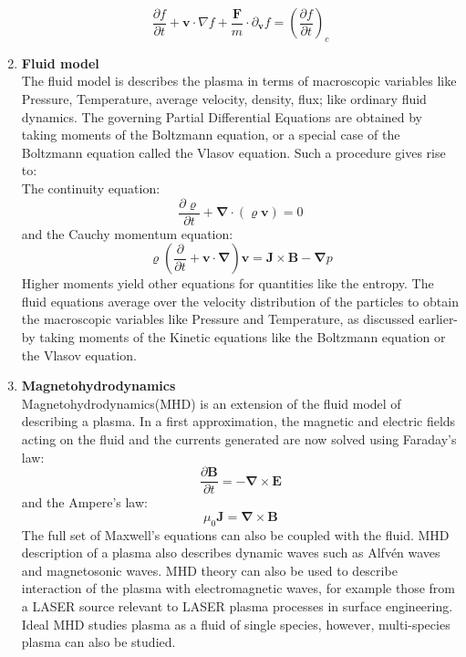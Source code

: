 \documentclass[12pt]{article}
\begin{document}
\begin{enumerate}
		$$\frac{\partial f}{\partial t} + \boldsymbol{v} \cdot \nabla f + \frac{\mathbf{F}}{m} \cdot {\partial}_{\boldsymbol{v}} f = \left(\frac{\partial f}{\partial t}\right)_{c}$$
		\item \textbf{Fluid model} \\
		The fluid model is describes the plasma in terms of macroscopic variables like Pressure, Temperature, average velocity, density, flux; like ordinary fluid dynamics. The governing Partial Differential Equations are obtained by taking moments of the Boltzmann equation, or a special case of the Boltzmann equation called the Vlasov equation. Such a procedure gives rise to: \\
		
		The continuity equation: \\
		$$\frac{\partial \varrho}{\partial t} + \boldsymbol{\nabla} \cdot \left(\varrho \boldsymbol{v}\right) = 0$$
		and the Cauchy momentum equation: \\
		$$\varrho \left(\frac{\partial}{\partial t} + \boldsymbol{v} \cdot \boldsymbol{\nabla}  \right) \boldsymbol{v} = \mathbf{J} \times \mathbf{B} - \boldsymbol{\nabla} p$$
		Higher moments yield other equations for quantities like the entropy. The fluid equations average over the velocity distribution of the particles to obtain the macroscopic variables like Pressure and Temperature, as discussed earlier- by taking moments of the Kinetic equations like the Boltzmann equation or the Vlasov equation.
		
		\item \textbf{Magnetohydrodynamics} \\
		Magnetohydrodynamics(MHD) is an extension of the fluid model of describing a plasma. In a first approximation, the magnetic and electric fields acting on the fluid and the currents generated are now solved using Faraday's law: \\
		$$\frac{\partial \mathbf{B}}{\partial t} = - \boldsymbol{\nabla} \times \mathbf{E}$$
		and the Ampere's law: \\
		$$\mu_{0} \mathbf{J} = \boldsymbol{\nabla} \times \mathbf{B}$$
		The full set of Maxwell's equations can also be coupled with the fluid. MHD description of a plasma also describes dynamic waves such as Alfv\'en waves and magnetosonic waves. MHD theory can also be used to describe interaction of the plasma with electromagnetic waves, for example those from a LASER source relevant to LASER plasma processes in surface engineering. Ideal MHD studies plasma as a fluid of single species, however, multi-species plasma can also be studied. \\
		

\end{enumerate}
\end{document}
